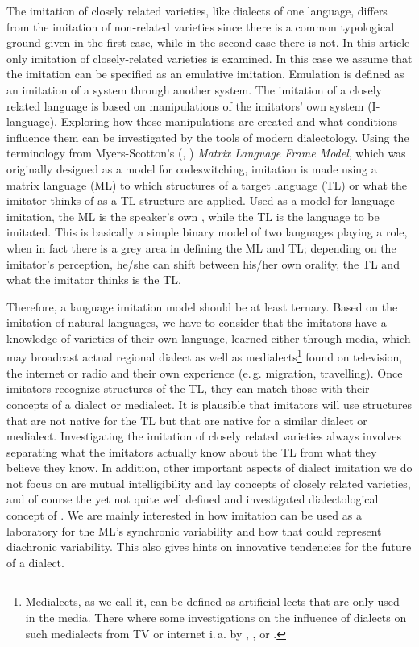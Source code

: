 \documentclass[output=paper]{LSP/langsci}
\begin{document}
The imitation of closely related varieties, like dialects of one language, differs from the imitation of non-related varieties since there is a common typological ground given in the first case, while in the second case there is not. In this article only imitation of closely-related varieties is examined. In this case we assume that the imitation can be specified as an emulative imitation. Emulation is defined as an imitation of a system through another system. The imitation of a closely related language is based on manipulations of the imitators’ own system (I-language). Exploring how these manipulations are created and what conditions influence them can be investigated by the tools of modern dialectology. Using the terminology from Myers-Scotton’s (\citeyear{myers-scotton_duelling_1993}, \citeyear{myers-scotton_contact_2002}) \textit{Matrix Language Frame Model}, which was originally designed as a model for codeswitching, imitation is made using a matrix language (ML) to which structures of a target language (TL) or what the imitator thinks of as a TL-structure are applied. Used as a model for language imitation, the ML is the speaker’s own , while the TL is the language to be imitated. This is basically a simple binary model of two languages playing a role, when in fact there is a grey area in defining the ML and TL; depending on the imitator’s perception, he/she can shift between his/her own orality, the TL and what the imitator thinks is the TL.


Therefore, a language imitation model should be at least ternary. Based on the imitation of natural languages, we have to consider that the imitators have a knowledge of varieties of their own language, learned either through media, which may broadcast actual regional dialect as well as medialects\footnote{Medialects, as we call it, can be defined as artificial lects that are only used in the media. There where some investigations on the influence of dialects on such medialects from TV or internet i.\,a. by \cite{kleiner_medienbairisch_2013}, \cite{androutsopoulos_intermediale_2012}, \cite{riemann_neue_2009} or \cite{mayer_mia_2009}.} found on television, the internet or radio and their own experience (e.\,g. migration, travelling). Once imitators recognize structures of the TL, they can match those with their concepts of a dialect or medialect. It is plausible that imitators will use structures that are not native for the TL but that are native for a similar dialect or medialect. Investigating the imitation of closely related varieties always involves separating what the imitators actually know about the TL from what they believe they know. In addition, other important aspects of dialect imitation we do not focus on are mutual intelligibility and lay concepts of closely related varieties, and of course the yet not quite well defined and investigated dialectological concept of . We are mainly interested in how imitation can be used as a laboratory for the ML's synchronic variability and how that could represent diachronic variability. This also gives hints on innovative tendencies for the future of a dialect. 
\end{document}
